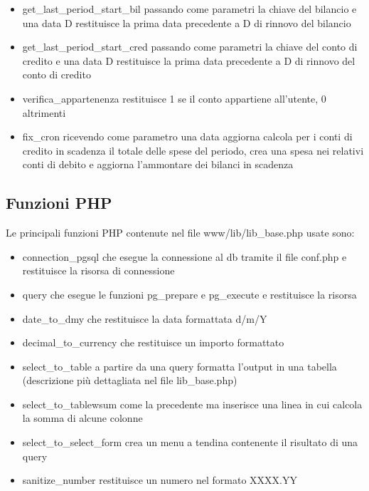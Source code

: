 \documentclass[a4paper,10pt]{article}
\begin{document}
\begin{itemize}
\begin{itemize}
\item get\_{}last\_{}period\_{}start\_{}bil passando come parametri la chiave del bilancio e una data D restituisce la prima data precedente a D di rinnovo del bilancio
\item get\_{}last\_{}period\_{}start\_{}cred passando come parametri la chiave del conto di credito e una data D restituisce la prima data precedente a D di rinnovo del conto di credito
\item verifica\_{}appartenenza restituisce 1 se il conto appartiene all'utente, 0 altrimenti
\item fix\_{}cron ricevendo come parametro una data aggiorna calcola per i conti di credito in scadenza il totale delle spese del periodo, crea una spesa nei relativi conti di debito e aggiorna l'ammontare dei bilanci in scadenza

\end{itemize} 

\end{itemize}

\subsection{Funzioni PHP}
Le principali funzioni PHP contenute nel file www/lib/lib\_{}base.php usate sono:
\begin{itemize}
\item connection\_{}pgsql che esegue la connessione al db tramite il file conf.php e restituisce la risorsa di connessione
\item query che esegue le funzioni pg\_{}prepare e pg\_{}execute e restituisce la risorsa
\item date\_{}to\_{}dmy che restituisce la data formattata d/m/Y
\item decimal\_{}to\_{}currency che restituisce un importo formattato
\item select\_{}to\_{}table a partire da una query formatta l'output in una tabella (descrizione più dettagliata nel file lib\_{}base.php)
\item select\_{}to\_{}tablewsum come la precedente ma inserisce una linea in cui calcola la somma di alcune colonne
\item select\_{}to\_{}select\_{}form crea un menu a tendina contenente il risultato di una query
\item sanitize\_{}number restituisce un numero nel formato XXXX.YY

\end{itemize} 
\end{document}
